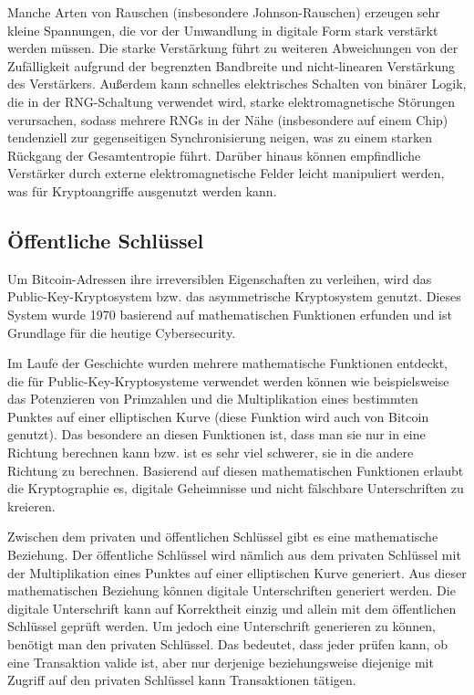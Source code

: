Manche Arten von Rauschen (insbesondere Johnson-Rauschen) erzeugen sehr kleine Spannungen, die vor der Umwandlung in digitale Form stark verstärkt
werden müssen. Die starke Verstärkung führt zu weiteren Abweichungen von der Zufälligkeit aufgrund der begrenzten Bandbreite und nicht-linearen 
Verstärkung des Verstärkers. Außerdem kann schnelles elektrisches Schalten von binärer Logik, die in der RNG-Schaltung verwendet wird, starke 
elektromagnetische Störungen verursachen, sodass mehrere RNGs in der Nähe (insbesondere auf einem Chip) tendenziell zur gegenseitigen 
Synchronisierung neigen, was zu einem starken Rückgang der Gesamtentropie führt. Darüber hinaus können empfindliche Verstärker durch externe 
elektromagnetische Felder leicht manipuliert werden, was für Kryptoangriffe ausgenutzt werden kann. 


\subsection{Öffentliche Schlüssel}
Um Bitcoin-Adressen ihre irreversiblen Eigenschaften zu verleihen, wird das Public-Key-Kryptosystem bzw. das asymmetrische
Kryptosystem genutzt. Dieses System wurde 1970 basierend auf mathematischen Funktionen erfunden und ist Grundlage für die heutige
Cybersecurity.

Im Laufe der Geschichte wurden mehrere mathematische Funktionen entdeckt, die für Public-Key-Kryptosysteme verwendet werden können
wie beispielsweise das Potenzieren von Primzahlen und die Multiplikation eines bestimmten Punktes auf einer elliptischen Kurve
(diese Funktion wird auch von Bitcoin genutzt). Das besondere an diesen Funktionen ist, dass man sie nur in eine Richtung
berechnen kann bzw. ist es sehr viel schwerer, sie in die andere Richtung zu berechnen. Basierend auf diesen mathematischen
Funktionen erlaubt die Kryptographie es, digitale Geheimnisse und nicht fälschbare Unterschriften zu kreieren. 

Zwischen dem privaten und öffentlichen Schlüssel gibt es eine mathematische Beziehung. Der öffentliche Schlüssel wird nämlich
aus dem privaten Schlüssel mit der Multiplikation eines Punktes auf einer elliptischen Kurve generiert. Aus dieser mathematischen
Beziehung können digitale Unterschriften generiert werden. Die digitale Unterschrift kann auf Korrektheit einzig und allein mit
dem öffentlichen Schlüssel geprüft werden. Um jedoch eine Unterschrift generieren zu können, benötigt man den privaten Schlüssel.
Das bedeutet, dass jeder prüfen kann, ob eine Transaktion valide ist, aber nur derjenige beziehungsweise diejenige mit Zugriff auf den 
privaten Schlüssel kann Transaktionen tätigen.

